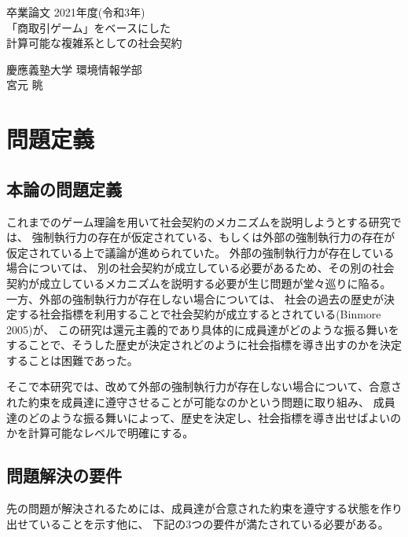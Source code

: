 \documentclass[a4j]{ujreport}
\date{\today}
\def\title{「商取引ゲーム」をベースにした\\計算可能な複雑系としての社会契約}
\def\author{宮元 眺}
\def\dept{慶應義塾大学 環境情報学部}
\begin{document}
\begin{titlepage}
  \begin{center}
    \begin{large}
      卒業論文   2021年度(令和3年)\\
      \vspace{24pt}
      \title
    \end{large}
  \end{center}
  \vspace{40em}
  \begin{flushright}
    \large \dept\\
    \author
  \end{flushright}
\end{titlepage}



\tableofcontents\thispagestyle{plain}



\chapter{問題定義}
\section{本論の問題定義}
これまでのゲーム理論を用いて社会契約のメカニズムを説明しようとする研究では、
強制執行力の存在が仮定されている、もしくは外部の強制執行力の存在が仮定されている上で議論が進められていた。
外部の強制執行力が存在している場合については、
別の社会契約が成立している必要があるため、その別の社会契約が成立しているメカニズムを説明する必要が生じ問題が堂々巡りに陥る。
一方、外部の強制執行力が存在しない場合については、
社会の過去の歴史が決定する社会指標を利用することで社会契約が成立するとされている(Binmore 2005\cite{Binmore 2005})が、
この研究は還元主義的であり具体的に成員達がどのような振る舞いをすることで、そうした歴史が決定されどのように社会指標を導き出すのかを決定することは困難であった。

そこで本研究では、改めて外部の強制執行力が存在しない場合について、合意された約束を成員達に遵守させることが可能なのかという問題に取り組み、
成員達のどのような振る舞いによって、歴史を決定し、社会指標を導き出せばよいのかを計算可能なレベルで明確にする。


\section{問題解決の要件}
先の問題が解決されるためには、成員達が合意された約束を遵守する状態を作り出せていることを示す他に、
下記の3つの要件が満たされている必要がある。
\end{document}
